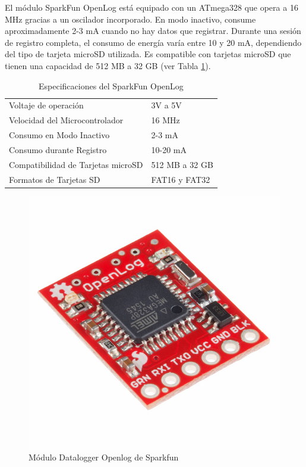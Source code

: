 El módulo SparkFun OpenLog está equipado con un ATmega328 que opera a 16 MHz gracias a un oscilador incorporado. En modo inactivo, consume aproximadamente 2-3 mA cuando no hay datos que registrar. Durante una sesión de registro completa, el consumo de energía varía entre 10 y 20 mA, dependiendo del tipo de tarjeta microSD utilizada. Es compatible con tarjetas microSD que tienen una capacidad de 512 MB a 32 GB (ver Tabla \ref{tab:openlog_sparkfun_tabla_specs})\cite{sparkfun-13712}.



\begin{table}[h]
\centering
\caption{Especificaciones del SparkFun OpenLog}
\label{tab:openlog_sparkfun_tabla_specs}
\begin{tabular}{l l}
\toprule
Voltaje de operación & 3V a 5V \\
Velocidad del Microcontrolador & 16 MHz \\
Consumo en Modo Inactivo & 2-3 mA \\
Consumo durante Registro & 10-20 mA \\
Compatibilidad de Tarjetas microSD & 512 MB a 32 GB \\
Formatos de Tarjetas SD & FAT16 y FAT32 \\
\bottomrule
\end{tabular}
\end{table}


\begin{figure}[htbp]
  \centering
  \includegraphics[width=0.4\linewidth]{Pictures/datalogger.jpg} 
  \caption{Módulo Datalogger Openlog de Sparkfun}
  \label{fig:datalogger}
\end{figure}


